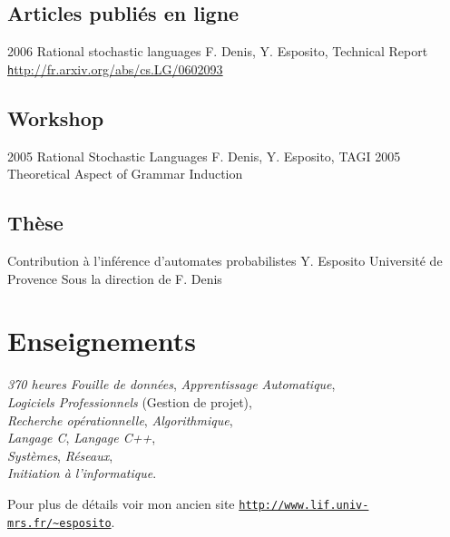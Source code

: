 \subsection*{Articles publiés en ligne}

\article
{2006}
{Rational stochastic languages}
{ F. Denis, Y. Esposito,}
{Technical Report}
{\href{http://fr.arxiv.org/abs/cs.LG/0602093}{\texttt http://fr.arxiv.org/abs/cs.LG/0602093}}

\subsection*{Workshop}

\article
{2005}
{Rational Stochastic Languages}
{F. Denis, Y. Esposito,}
{TAGI 2005}
{Theoretical Aspect of Grammar Induction}

\subsection*{Thèse}
{Contribution à l'inférence d'automates probabilistes}
{Y. Esposito}
{Université de Provence}
{Sous la direction de F. Denis}

\section*{Enseignements}

{\emph{370 heures}}
{\emph{Fouille de données}, \emph{Apprentissage Automatique},\\
\emph{Logiciels Professionnels} (Gestion de projet),\\
\emph{Recherche opérationnelle}, \emph{Algorithmique},\\
\emph{Langage C}, \emph{Langage C++},\\
\emph{Systèmes}, \emph{Réseaux},\\
\emph{Initiation à l'informatique}.
}

\footnotesize{
    Pour plus de détails voir mon ancien site 
    \href{http://www.lif.univ-mrs.fr/~esposito}
    {\texttt{http\string://www.lif.univ-mrs.fr/\textasciitilde{}esposito}}.
}



